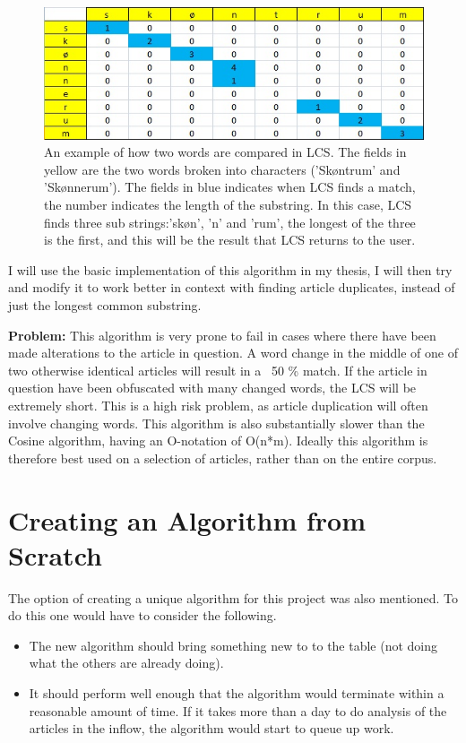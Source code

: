 \begin{figure}[h]
	\centering
	\includegraphics[scale=0.75]{figures/LcsExplained}
	\caption{An example of how two words are compared in LCS. The fields in yellow are the two words broken into characters ('Skøntrum' and 'Skønnerum'). The fields in blue indicates when LCS finds a match, the number indicates the length of the substring. In this case, LCS finds three sub strings:'skøn', 'n' and 'rum', the longest of the three is the first, and this will be the result that LCS returns to the user. }
	\label{LcsExplained}
\end{figure}

I will use the basic implementation of this algorithm in my thesis, I will then try and modify it to work better in context with finding article duplicates, instead of just the longest common substring.

\textbf{Problem:} This algorithm is very prone to fail in cases where there have been made alterations to the article in question. A word change in the middle of one of two otherwise identical articles will result in a ~50 \% match. If the article in question have been obfuscated with many changed words, the LCS will be extremely short. This is a high risk problem, as article duplication will often involve changing words. This algorithm is also substantially slower than the Cosine algorithm, having an O-notation of O(n*m). Ideally this algorithm is therefore best used on a selection of articles, rather than on the entire corpus.

\section{Creating an Algorithm from Scratch}
The option of creating a unique algorithm for this project was also mentioned. To do this one would have to consider the following.

\begin{itemize}
	\item The new algorithm should bring something new to to the table (not doing what the others are already doing).
	\item It should perform well enough that the algorithm would terminate within a reasonable amount of time. If it takes more than a day to do analysis of the articles in the inflow, the algorithm would start to queue up work.
\end{itemize}

